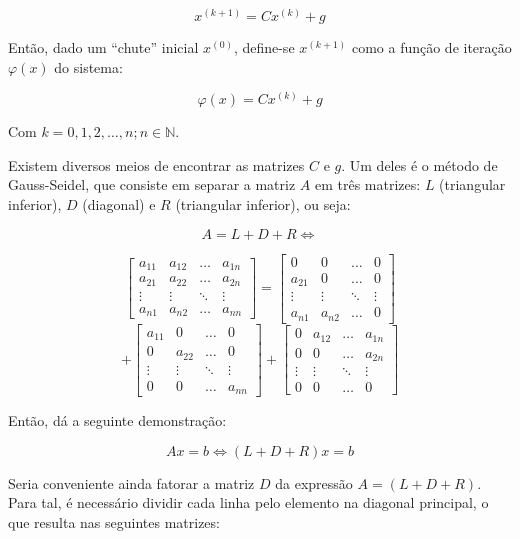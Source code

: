 \documentclass[twocolumn, 10pt]{extarticle}
\begin{document}
\[
x^{(k+1)} = Cx^{(k)}+g
\]

Então, dado um ``chute'' inicial $x^{(0)}$, define-se $x^{(k+1)}$ como a função de iteração $\varphi(x)$ do sistema:

\[
\varphi(x) = Cx^{(k)}+g
\]

Com $k = 0, 1, 2, \dots, n; n \in \mathbb{N} $.

Existem diversos meios de encontrar as matrizes $C$ e $g$. Um deles é o método de Gauss-Seidel, que consiste em separar a matriz $A$ em três matrizes: $L$ (triangular inferior), $D$ (diagonal) e $R$ (triangular inferior), ou seja:

\[A = L + D + R \iff\]

\[
\begin{bmatrix}
a_{11} & a_{12} & \dots & a_{1n} \\
a_{21} & a_{22} & \dots & a_{2n} \\
\vdots & \vdots & \ddots & \vdots \\
a_{n1} & a_{n2} & \dots & a_{nn}  
\end{bmatrix}
=
\begin{bmatrix}
0 & 0 & \dots & 0 \\
a_{21} & 0 & \dots & 0 \\
\vdots & \vdots & \ddots & \vdots \\
a_{n1} & a_{n2} & \dots & 0  
\end{bmatrix}
\]
\[
+
\begin{bmatrix}
a_{11} & 0 & \dots & 0 \\
0 & a_{22} & \dots & 0 \\
\vdots & \vdots & \ddots & \vdots \\
0 & 0 & \dots & a_{nn}  
\end{bmatrix}
+
\begin{bmatrix}
0 & a_{12} & \dots & a_{1n} \\
0 & 0 & \dots & a_{2n} \\
\vdots & \vdots & \ddots & \vdots \\
0 & 0 & \dots & 0 
\end{bmatrix}
\]

Então, \cite[p. 164]{ruggiero} dá a seguinte demonstração:

\[
Ax = b \iff (L + D + R)x = b
\]

Seria conveniente ainda fatorar a matriz $D$ da expressão $A = (L + D + R)$. Para tal, é necessário dividir cada linha pelo elemento na diagonal principal, o que resulta nas seguintes matrizes:
\end{document}
